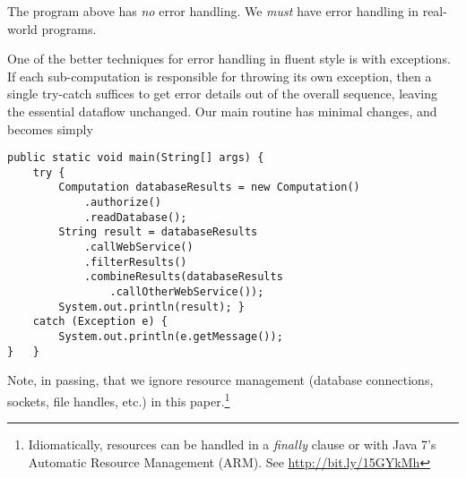 \documentclass[11pt]{article}
\begin{document}
The program above has \emph{no} error handling. We \emph{must} have error
handling in real-world programs.

One of the better techniques for error handling in fluent style is
with exceptions. If each sub-computation is responsible for
throwing its own exception, then a single try-catch suffices to get
error details out of the overall sequence, leaving the essential
dataflow unchanged. Our main routine has minimal changes, and
becomes simply
\begin{verbatim}
public static void main(String[] args) {
    try {
        Computation databaseResults = new Computation()
            .authorize()
            .readDatabase();
        String result = databaseResults
            .callWebService()
            .filterResults()
            .combineResults(databaseResults
                .callOtherWebService());
        System.out.println(result); }
    catch (Exception e) {
        System.out.println(e.getMessage());
}   }
\end{verbatim}
Note, in passing, that we ignore resource management (database
connections, sockets, file handles, etc.) in this
paper.\footnote{Idiomatically, resources can be handled in a \emph{finally}
   clause or with Java 7's Automatic Resource Management (ARM). See
   \url{http://bit.ly/15GYkMh}}
\end{document}
